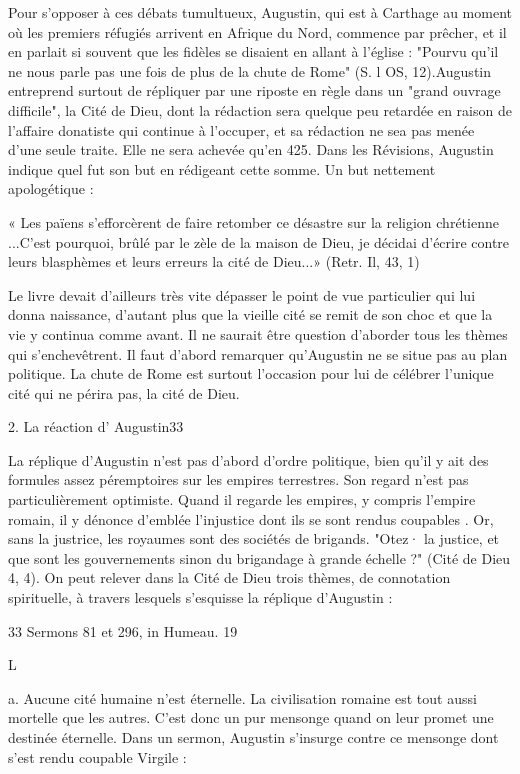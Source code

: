 Pour s'opposer à ces débats tumultueux, Augustin, qui est à Carthage au moment où les premiers réfugiés arrivent en Afrique du Nord, commence par prêcher, et il en parlait si souvent que les fidèles se disaient en allant à l'église : "Pourvu qu'il ne nous parle pas une fois de plus de la chute de Rome" (S. l OS, 12).Augustin entreprend surtout de répliquer par une riposte en règle dans un "grand ouvrage difficile", la Cité de Dieu, dont la rédaction sera quelque peu retardée en raison de l'affaire donatiste qui continue à l'occuper, et sa rédaction ne sea pas menée d'une seule traite. Elle ne sera achevée qu'en 425. Dans les Révisions, Augustin indique quel fut son but en rédigeant cette somme. Un but nettement apologétique :

« Les païens s'efforcèrent de faire retomber ce désastre sur la religion chrétienne ...C'est pourquoi, brûlé par le zèle de la maison de Dieu, je décidai d'écrire contre leurs blasphèmes et leurs erreurs la cité de Dieu...» (Retr. Il, 43, 1)

Le livre devait d'ailleurs très vite dépasser le point de vue particulier qui lui donna naissance, d'autant plus que la vieille cité se remit de son choc et que la vie y continua comme avant. Il ne saurait être question d'aborder tous les thèmes qui s'enchevêtrent. Il faut d'abord remarquer qu'Augustin ne se situe pas au plan politique. La chute de Rome est surtout l'occasion pour lui de célébrer l'unique cité qui ne périra pas, la cité de Dieu.

2.	La réaction d' Augustin33  

La réplique d'Augustin n'est pas d'abord d'ordre politique, bien qu'il y ait des formules assez péremptoires sur les empires terrestres. Son regard n'est pas particulièrement optimiste. Quand il regarde les empires, y compris l'empire romain, il y dénonce d'emblée l'injustice dont ils se sont rendus coupables . Or, sans la justrice, les royaumes sont des sociétés de brigands. "Otez· la justice, et que sont les gouvernements sinon du brigandage à grande échelle ?" (Cité de Dieu 4, 4). On peut relever dans la Cité de Dieu trois thèmes, de connotation spirituelle,  à travers lesquels s'esquisse la réplique d'Augustin :






33 Sermons 81 et 296, in Humeau.
19
 
	L





a.	Aucune cité humaine n'est éternelle. La civilisation romaine est tout	  aussi mortelle que les autres. C'est donc un pur mensonge quand on leur promet une
destinée éternelle. Dans un sermon, Augustin s'insurge contre ce mensonge dont s'est rendu coupable Virgile :


